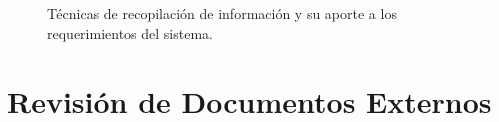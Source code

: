 %
%
%
%
%
%
%
\begin{figure}[H]
  \centering
  \caption{Técnicas de recopilación de información y su aporte a los requerimientos del sistema.}
  \label{fig:fuentes-recopilacion}
\end{figure}

\section{Revisión de Documentos Externos}

